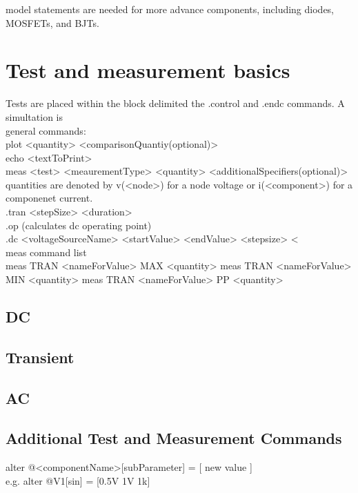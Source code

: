 \documentclass[a4paper]{article}
\begin{document}
model statements are needed for more advance components, including diodes, MOSFETs, and BJTs.\\
\newpage
\section{Test and measurement basics}
Tests are placed within the block delimited the .control and .endc commands. A simultation is \\
general commands:\\
plot <quantity> <comparisonQuantiy(optional)>\\
echo <textToPrint>\\
meas <test> <meaurementType> <quantity> <additionalSpecifiers(optional)>\\
quantities are denoted by v(<node>) for a node voltage or i(<component>) for a componenet current.\\

.tran <stepSize> <duration>\\
.op (calculates dc operating point)\\
.dc <voltageSourceName> <startValue> <endValue> <stepsize> <\\

meas command list\\
meas TRAN <nameForValue> MAX <quantity>
meas TRAN <nameForValue> MIN <quantity>
meas TRAN <nameForValue> PP <quantity>


\subsection{DC} 
\subsection{Transient}
\subsection{AC}
\subsection{Additional Test and Measurement Commands}
alter @<componentName>[subParameter] = [ new value ]\\
e.g. alter @V1[sin] = [0.5V 1V 1k]
\end{document}
